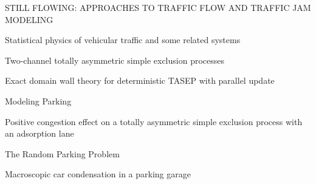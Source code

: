 \documentclass[]{article}
\begin{document}
\begin{thebibliography}{9}
STILL FLOWING: APPROACHES TO TRAFFIC FLOW AND
TRAFFIC JAM MODELING

Statistical physics of vehicular traffic and some related systems

Two-channel totally asymmetric simple exclusion
processes

Exact domain wall theory for deterministic TASEP with parallel update

Modeling Parking 

Positive congestion effect on a totally asymmetric simple exclusion process with an adsorption lane

The Random Parking Problem 

Macroscopic car condensation in a parking garage


	
\end{thebibliography}
\end{document}

